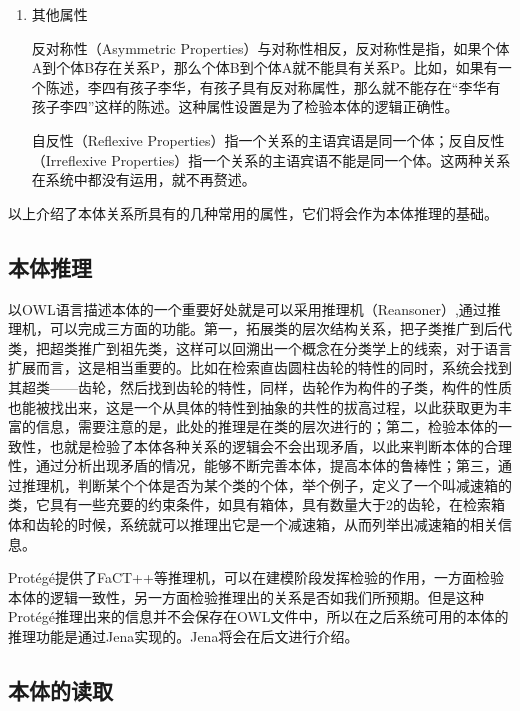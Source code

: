 \documentclass[12pt,a4paper]{article}
\begin{document}
\begin{enumerate}[(1)]
		\item 其他属性

	\quad \quad 反对称性（{\Times Asymmetric Properties}）与对称性相反，反对称性是指，如果个体{\Times A}到个体{\Times B}存在关系{\Times P}，那么个体{\Times B}到个体{\Times A}就不能具有关系{\Times P}。比如，如果有一个陈述，李四有孩子李华，有孩子具有反对称属性，那么就不能存在“李华有孩子李四”这样的陈述。这种属性设置是为了检验本体的逻辑正确性。
	
	\quad \quad 自反性（{\Times Reflexive Properties}）指一个关系的主语宾语是同一个体；反自反性（{\Times Irreflexive Properties}）指一个关系的主语宾语不能是同一个体。这两种关系在系统中都没有运用，就不再赘述。
	
\end{enumerate}
	\vspace{6pt}

	以上介绍了本体关系所具有的几种常用的属性，它们将会作为本体推理的基础。
	
	\subsection{本体推理}
	以{\Times OWL}语言描述本体的一个重要好处就是可以采用推理机（{\Times Reansoner}）,通过推理机，可以完成三方面的功能。第一，拓展类的层次结构关系，把子类推广到后代类，把超类推广到祖先类，这样可以回溯出一个概念在分类学上的线索，对于语言扩展而言，这是相当重要的。比如在检索直齿圆柱齿轮的特性的同时，系统会找到其超类——齿轮，然后找到齿轮的特性，同样，齿轮作为构件的子类，构件的性质也能被找出来，这是一个从具体的特性到抽象的共性的拔高过程，以此获取更为丰富的信息，需要注意的是，此处的推理是在类的层次进行的；第二，检验本体的一致性，也就是检验了本体各种关系的逻辑会不会出现矛盾，以此来判断本体的合理性，通过分析出现矛盾的情况，能够不断完善本体，提高本体的鲁棒性；第三，通过推理机，判断某个个体是否为某个类的个体，举个例子，定义了一个叫减速箱的类，它具有一些充要的约束条件，如具有箱体，具有数量大于2的齿轮，在检索箱体和齿轮的时候，系统就可以推理出它是一个减速箱，从而列举出减速箱的相关信息。
	
	{\Times Prot{\'e}g{\'e}}提供了{\Times FaCT++}等推理机，可以在建模阶段发挥检验的作用，一方面检验本体的逻辑一致性，另一方面检验推理出的关系是否如我们所预期。但是这种{\Times Prot{\'e}g{\'e}}推理出来的信息并不会保存在{\Times OWL}文件中，所以在之后系统可用的本体的推理功能是通过{\Times Jena}实现的。{\Times Jena}将会在后文进行介绍。
	
	\subsection{本体的读取}
\end{document}
